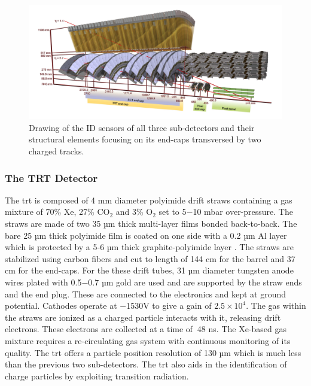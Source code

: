 \begin{figure}[h]
  \centering
  \includegraphics[scale=0.4]{figs/ch3/ID-end-caps.png}
  \caption{  Drawing of the ID sensors of all three sub-detectors and their structural elements focusing on its end-caps transversed by two charged tracks. \cite{atlas}}
\label{fig:3.7}
\end{figure}

\subsubsection{The TRT Detector}

The \gls{trt} is composed of 4 mm diameter polyimide drift straws containing a gas mixture of 70\% Xe, 27\% $\textrm{CO}_{\textrm{2}}$ and 
3\% $\textrm{O}_{\textrm{2}}$ set to 5$-$10 mbar over-pressure. The straws are made of two 35 µm thick multi-layer films bonded back-to-back.
The bare 25 µm thick polyimide film is coated on one side with a 0.2 µm Al layer which is protected by a 5-6 µm thick graphite-polyimide layer \cite{atlas}.
The straws are stabilized using carbon fibers and cut to length of 144 cm for the barrel and 37 cm for the end-caps. For the these drift tubes,
31 µm diameter tungsten anode wires plated with 0.5$-$0.7 µm gold are used and are supported by the straw ends and the end plug. These 
are connected to the electronics and kept at ground potential. Cathodes operate at $-$1530V to give a gain of $\textrm{2.5}\times\textrm{10}^{\textrm{4}}$.
The gas within the straws are ionized as a charged particle interacts with it, releasing drift electrons. These electrons are collected at 
a time of $~$48 ns. The Xe-based gas mixture requires a re-circulating gas system with continuous monitoring of its
quality. The \gls{trt} offers a particle position resolution of 130 µm which is much less than the previous two sub-detectors. The 
\gls{trt} also aids in the identification of charge particles by exploiting transition radiation. 

